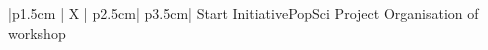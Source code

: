 
%
\iftrue %
\begin{myTableEnv}{|p{1.5cm} | X | p{2.5cm}| p{3.5cm}|}
    \myRow
        {Start}{}
        {Initiative}{PopSci Project}
    \myRow
        {}{Organisation of workshop}
        {}{}
\end{myTableEnv}
%
\fi
%